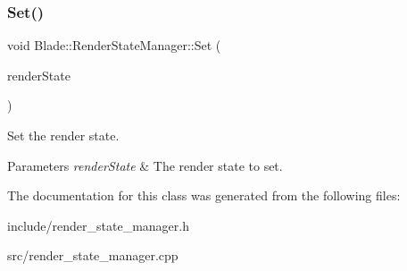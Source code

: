 \subsubsection{\texorpdfstring{Set()}{Set()}}
{\footnotesize\ttfamily void Blade\+::\+Render\+State\+Manager\+::\+Set (\begin{DoxyParamCaption}\item[{Render\+State\+Type}]{render\+State }\end{DoxyParamCaption})\hspace{0.3cm}{\ttfamily [noexcept]}}



Set the render state. 


\begin{DoxyParams}{Parameters}
{\em render\+State} & The render state to set. \\
\hline
\end{DoxyParams}


The documentation for this class was generated from the following files\+:\begin{DoxyCompactItemize}
\item 
include/render\+\_\+state\+\_\+manager.\+h\item 
src/render\+\_\+state\+\_\+manager.\+cpp\end{DoxyCompactItemize}
